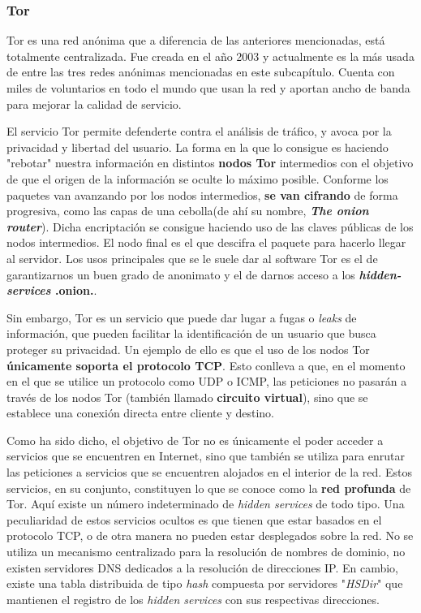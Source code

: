 \subsubsection {Tor}
Tor es una red anónima que a diferencia de las anteriores mencionadas, está totalmente centralizada. Fue creada en el año 2003 y actualmente es la más usada de entre las tres redes anónimas mencionadas en este subcapítulo. Cuenta con miles de voluntarios en todo el mundo que usan la red y aportan ancho de banda para mejorar la calidad de servicio.

El servicio Tor permite defenderte contra el análisis de tráfico, y avoca por la privacidad y libertad del usuario. La forma en la que lo consigue es haciendo "rebotar" nuestra información en distintos \textbf{nodos Tor} intermedios con el objetivo de que el origen de la información se oculte lo máximo posible.
Conforme los paquetes van avanzando por los nodos intermedios, \textbf{se van cifrando }de forma progresiva, como las capas de una cebolla(de ahí su nombre, \textbf{\textit{The onion router}}).
Dicha encriptación se consigue haciendo uso de las claves públicas de los nodos intermedios. El nodo final es el que descifra el paquete para hacerlo llegar al servidor.
Los usos principales que se le suele dar al software Tor es el de garantizarnos un buen grado de anonimato y el de darnos acceso a los \textbf{\textit{hidden-services} .onion.}.

Sin embargo, Tor es un servicio que puede dar lugar a fugas o \textit{leaks} de información, que pueden facilitar la identificación de un usuario que busca proteger su privacidad. Un ejemplo de ello es que el uso de los nodos Tor \textbf{únicamente soporta el protocolo TCP}. 
Esto conlleva a que, en el momento en el que se utilice un protocolo como UDP o ICMP, las peticiones no pasarán a través de los nodos Tor (también llamado \textbf{circuito virtual}), sino que se establece una conexión directa entre cliente y destino.

Como ha sido dicho, el objetivo de Tor no es únicamente el poder acceder a servicios que se encuentren en Internet, sino que también se utiliza para enrutar las peticiones a servicios que se encuentren alojados en el interior de la red. Estos servicios, en su conjunto, constituyen lo que se conoce como la \textbf{red profunda} de Tor.
Aquí existe un número indeterminado de \textit{hidden services} de todo tipo. Una peculiaridad de estos servicios ocultos es que tienen que estar basados en el protocolo TCP, o de otra manera no pueden estar desplegados sobre la red.
No se utiliza un mecanismo centralizado para la resolución de nombres de dominio, no existen servidores DNS dedicados a la resolución de direcciones IP. En cambio, existe una tabla distribuida de tipo \textit{hash} compuesta por servidores "\textit{HSDir}" que mantienen el registro de los \textit{hidden services} con sus respectivas direcciones.

